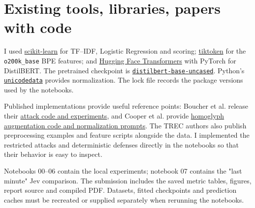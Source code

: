 \section{Existing tools, libraries, papers with code}
I used \href{https://scikit-learn.org/stable/modules/generated/sklearn.feature_extraction.text.TfidfVectorizer.html}{scikit-learn} for TF--IDF, Logistic Regression and scoring; \href{https://github.com/openai/tiktoken}{tiktoken} for the \texttt{o200k\_base} BPE features; and \href{https://huggingface.co/docs/transformers/en/index}{Hugging Face Transformers} with PyTorch for DistilBERT. The pretrained checkpoint is \href{https://huggingface.co/distilbert/distilbert-base-uncased}{\texttt{distilbert-base-uncased}}. Python's \href{https://docs.python.org/3.12/library/unicodedata.html}{\texttt{unicodedata}} provides normalization. The lock file records the package versions used by the notebooks.

Published implementations provide useful reference points: Boucher et al. release their \href{https://github.com/nickboucher/imperceptible}{attack code and experiments}, and Cooper et al. provide \href{https://github.com/pcoopercoder/The-Lies-Characters-Tell}{homoglyph augmentation code and normalization prompts}. The TREC authors also publish preprocessing examples and feature scripts alongside the data. I implemented the restricted attacks and deterministic defenses directly in the notebooks so that their behavior is easy to inspect.

Notebooks 00--06 contain the local experiments; notebook 07 contains the "last minute" Jev comparison. The submission includes the saved metric tables, figures, report source and compiled PDF. Datasets, fitted checkpoints and prediction caches must be recreated or supplied separately when rerunning the notebooks.
